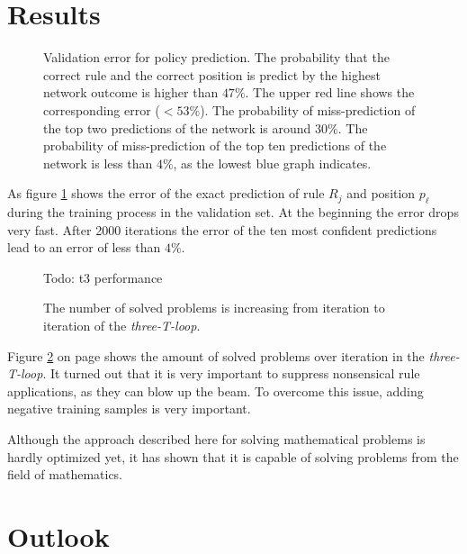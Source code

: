 \documentclass{scrartcl}
\theoremstyle{definition}
\begin{document}
\section{Results}

\begin{figure}[!htbp]
	\centering
	
	\caption{Validation error for policy prediction.
	The probability that the correct rule and the correct position is predict by the highest network outcome is higher than $ 47\%$.
	The upper red line shows the corresponding error ($<53\%$).
	The probability of miss-prediction of the top two predictions of the network is around $30\%$.
	The probability of miss-prediction of the top ten predictions of the network is less than $4\%$, as the lowest blue graph indicates.
	}
	\label{fig:training}
\end{figure}

As figure \ref{fig:training} shows the error of the exact prediction of rule $R_j$ and position $p_\ell$ during the training process in the validation set.
At the beginning the error drops very fast. After 2000 iterations the error of the ten most confident predictions lead to an error of less than $4\%$.


\begin{figure}[!htbp]
	\centering
	Todo: t3 performance
	\caption{The number of solved problems is increasing from iteration to iteration of the \textit{three-T-loop}.}
	\label{fig:t3loop_performance}
\end{figure}

Figure \ref{fig:t3loop_performance} on page \pageref{fig:t3loop_performance} shows the amount of solved problems over iteration in the \textit{three-T-loop}. 
It turned out that it is very important to suppress nonsensical rule applications, as they can blow up the beam.
To overcome this issue, adding negative training samples is very important.

Although the approach described here for solving mathematical problems is hardly optimized yet,
it has shown that it is capable of solving problems from the field of mathematics.


\section{Outlook}
\end{document}
